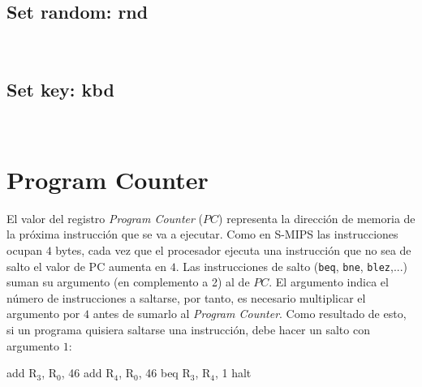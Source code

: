\documentclass[12pt]{amsart}
\begin{document}
	\subsection{Set random: \textbf{rnd}}\ 
	
	

	\subsection{Set key: \textbf{kbd}}\ 
	
	


	\section{Program Counter}
	
	El valor del registro \textit{Program Counter} ($PC$) representa la dirección de memoria de la próxima instrucción que se va a ejecutar. Como en S-MIPS las instrucciones ocupan $4$ bytes, cada vez que el procesador ejecuta una instrucción que no sea de salto el valor de PC aumenta en $4$. Las instrucciones de salto (\texttt{beq}, \texttt{bne}, \texttt{blez},...) suman su argumento (en complemento a 2) al de $PC$. El argumento indica el número de instrucciones a saltarse, por tanto, es necesario multiplicar el argumento por $4$ antes de sumarlo al \textit{Program Counter}. Como resultado de esto, si un programa quisiera saltarse una instrucción, debe hacer un salto con argumento $1$:
	
	\begin{itemize}
		\ttfamily
		\pto add R$_3$, R$_0$, 46
		\pto add R$_4$, R$_0$, 46
		\pto beq R$_3$, R$_4$, 1
		\pto halt
	\end{itemize}
\end{document}
